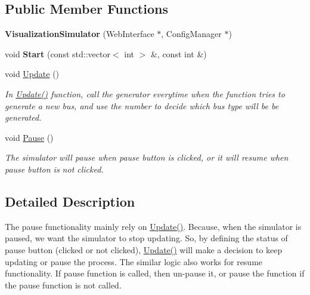 \subsection*{Public Member Functions}
\begin{DoxyCompactItemize}
\item 
\mbox{\label{classVisualizationSimulator_a6081cd133454d886ed412f44ad9e8237}} 
{\bfseries Visualization\+Simulator} (Web\+Interface $\ast$, Config\+Manager $\ast$)
\item 
\mbox{\label{classVisualizationSimulator_abbf0bc7c2913dd690900578e17a4cdcb}} 
void {\bfseries Start} (const std\+::vector$<$ int $>$ \&, const int \&)
\item 
\mbox{\label{classVisualizationSimulator_a211b13dd71e679f58bd645089ae10319}} 
void \hyperlink{classVisualizationSimulator_a211b13dd71e679f58bd645089ae10319}{Update} ()
\begin{DoxyCompactList}\small\item\em In \hyperlink{classVisualizationSimulator_a211b13dd71e679f58bd645089ae10319}{Update()} function, call the generator everytime when the function tries to generate a new bus, and use the number to decide which bus type will be be generated. \end{DoxyCompactList}\item 
\mbox{\label{classVisualizationSimulator_a7f0452e9e371a1bf2d8afb0873771da4}} 
void \hyperlink{classVisualizationSimulator_a7f0452e9e371a1bf2d8afb0873771da4}{Pause} ()
\begin{DoxyCompactList}\small\item\em The simulator will pause when pause button is clicked, or it will resume when pause button is not clicked. \end{DoxyCompactList}\end{DoxyCompactItemize}


\subsection{Detailed Description}
The pause functionality mainly rely on \hyperlink{classVisualizationSimulator_a211b13dd71e679f58bd645089ae10319}{Update()}. Because, when the simulator is paused, we want the simulator to stop updating. So, by defining the status of pause button (clicked or not clicked), \hyperlink{classVisualizationSimulator_a211b13dd71e679f58bd645089ae10319}{Update()} will make a decision to keep updating or pause the process. The similar logic also works for resume functionality. If pause function is called, then un-\/pause it, or pause the function if the pause function is not called. 

